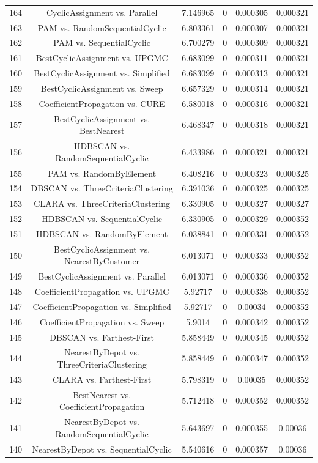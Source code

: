 \documentclass[a4paper,10pt]{article}
\begin{document}
\begin{landscape}
\begin{table}[!htp]
\begin{tabular}{cccccc}
164&CyclicAssignment vs. Parallel&7.146965&0&0.000305&0.000321\\
163&PAM vs. RandomSequentialCyclic&6.803361&0&0.000307&0.000321\\
162&PAM vs. SequentialCyclic&6.700279&0&0.000309&0.000321\\
161&BestCyclicAssignment vs. UPGMC&6.683099&0&0.000311&0.000321\\
160&BestCyclicAssignment vs. Simplified&6.683099&0&0.000313&0.000321\\
159&BestCyclicAssignment vs. Sweep&6.657329&0&0.000314&0.000321\\
158&CoefficientPropagation vs. CURE&6.580018&0&0.000316&0.000321\\
157&BestCyclicAssignment vs. BestNearest&6.468347&0&0.000318&0.000321\\
156&HDBSCAN vs. RandomSequentialCyclic&6.433986&0&0.000321&0.000321\\
155&PAM vs. RandomByElement&6.408216&0&0.000323&0.000325\\
154&DBSCAN vs. ThreeCriteriaClustering&6.391036&0&0.000325&0.000325\\
153&CLARA vs. ThreeCriteriaClustering&6.330905&0&0.000327&0.000327\\
152&HDBSCAN vs. SequentialCyclic&6.330905&0&0.000329&0.000352\\
151&HDBSCAN vs. RandomByElement&6.038841&0&0.000331&0.000352\\
150&BestCyclicAssignment vs. NearestByCustomer&6.013071&0&0.000333&0.000352\\
149&BestCyclicAssignment vs. Parallel&6.013071&0&0.000336&0.000352\\
148&CoefficientPropagation vs. UPGMC&5.92717&0&0.000338&0.000352\\
147&CoefficientPropagation vs. Simplified&5.92717&0&0.00034&0.000352\\
146&CoefficientPropagation vs. Sweep&5.9014&0&0.000342&0.000352\\
145&DBSCAN vs. Farthest-First&5.858449&0&0.000345&0.000352\\
144&NearestByDepot vs. ThreeCriteriaClustering&5.858449&0&0.000347&0.000352\\
143&CLARA vs. Farthest-First&5.798319&0&0.00035&0.000352\\
142&BestNearest vs. CoefficientPropagation&5.712418&0&0.000352&0.000352\\
141&NearestByDepot vs. RandomSequentialCyclic&5.643697&0&0.000355&0.00036\\
140&NearestByDepot vs. SequentialCyclic&5.540616&0&0.000357&0.00036\\

\end{tabular}
\end{table}
\end{landscape}
\end{document}
